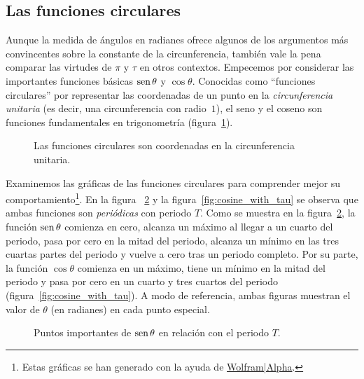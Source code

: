   \subsection{Las funciones circulares} %
  \label{sec:the_circle_functions}

Aunque la medida de ángulos en radianes ofrece algunos de los argumentos más convincentes sobre la constante de la circunferencia, también vale la pena comparar las virtudes de $\pi$ y $\tau$ en otros contextos. Empecemos por considerar las importantes funciones básicas $\mbox{sen}\,\theta$ y $\cos\theta$. Conocidas como ``funciones circulares'' por representar las coordenadas de un punto en la \emph{circunferencia unitaria} (es decir, una circunferencia con radio~$1$), el seno y el coseno son funciones fundamentales en trigonometría (figura~\ref{fig:circle_functions}).

\begin{figure}
\begin{center}
\end{center}
\caption{Las funciones circulares son coordenadas en la circunferencia unitaria.\label{fig:circle_functions}}
\end{figure}

Examinemos las gráficas de las funciones circulares para comprender mejor su comportamiento\footnote{Estas gráficas se han generado con la ayuda de \href{http://www.wolframalpha.com/}{Wolfram|Alpha}.}. En la figura ~\ref{fig:sine_with_tau} y la figura~\ref{fig:cosine_with_tau} se observa que ambas funciones son \emph{periódicas} con periodo $T$. Como se muestra en la figura~\ref{fig:sine_with_tau}, la función $\mbox{sen}\,\theta$ comienza en cero, alcanza un máximo al llegar a un cuarto del periodo, pasa por cero en la mitad del periodo, alcanza un mínimo en las tres cuartas partes del periodo y vuelve a cero tras un periodo completo. Por su parte, la función $\cos\theta$ comienza en un máximo, tiene un mínimo en la mitad del periodo y pasa por cero en un cuarto y tres cuartos del periodo (figura~\ref{fig:cosine_with_tau}). A modo de referencia, ambas figuras muestran el valor de $\theta$ (en radianes) en cada punto especial.

\begin{figure}
\begin{center}
\end{center}
\caption{Puntos importantes de $\mbox{sen}\,\theta$ en relación con el periodo $T$.\label{fig:sine_with_tau}}
\end{figure}

